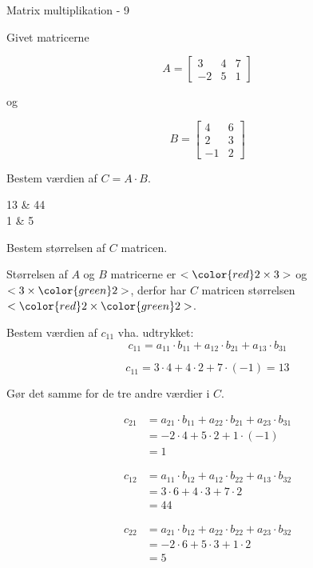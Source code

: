 \documentclass{article}
\begin{document}
\newpage

\begin{exercise}{Matrix multiplikation - 9}
	
	Givet matricerne 
	
	\[
	A = \left[\begin{array}{rrr}
	3 & 4 & 7 \\ 
	-2 & 5 & 1
	\end{array} \right]
	\]
	
	og 
	
	\[
	B = \left[\begin{array}{rr}
	4 & 6 \\ 
	2 & 3 \\
	-1 & 2 
	\end{array} \right]
	\]
	
	Bestem værdien af $C = A \cdot B$.
	
	\begin{answermatrix}
		13 & 44  \\
		1 & 5 
	\end{answermatrix}
	
	\hint
	Bestem størrelsen af $C$ matricen.
	
	\hint
	Størrelsen af $A$ og $B$ matricerne er $<{\color{red} 2} \times 3>$ og $<3 \times {\color{green}2}>$, 
	derfor har $C$ matricen størrelsen $<{\color{red} 2} \times {\color{green}2}>$.
	
	\hint
	Bestem værdien af $c_{11}$ vha. udtrykket:
	\[
	c_{11} = a_{11} \cdot b_{11} + a_{12} \cdot b_{21} + a_{13} \cdot b_{31}
	\]
	
	\hint
	\[
	c_{11} = 3 \cdot 4 + 4 \cdot 2 + 7 \cdot (-1) = 13
	\]
	
	\hint
	Gør det samme for de tre andre værdier i $C$.
	
	\hint
	\begin{align*}
		c_{21} & = a_{21} \cdot b_{11} + a_{22} \cdot b_{21} + a_{23} \cdot b_{31}   \\
		& = -2 \cdot 4 + 5 \cdot 2 + 1 \cdot (-1) \\
		& = 1
	\end{align*}
	
	\hint
	\begin{align*}
		c_{12} & = a_{11} \cdot b_{12} + a_{12} \cdot b_{22} + a_{13} \cdot b_{32}  \\
		& = 3 \cdot 6 + 4 \cdot 3 + 7 \cdot 2 \\
		& = 44
	\end{align*}
	
	\hint
	\begin{align*}
		c_{22} & = a_{21} \cdot b_{12} + a_{22} \cdot b_{22} + a_{23} \cdot b_{32}\\
		& = -2 \cdot 6 + 5 \cdot 3 + 1 \cdot 2 \\
		& = 5
	\end{align*}
	

\end{exercise}
\end{document}
